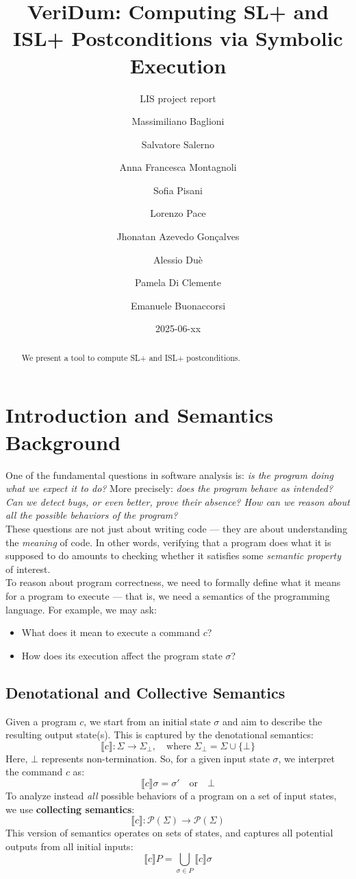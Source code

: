 \documentclass[parskip=half]{scrartcl}
\title{VeriDum: Computing SL+ and ISL+ Postconditions via Symbolic Execution}
\subtitle{LIS project report}
\date{2025-06-xx}
\author{ %
  Massimiliano Baglioni      \and
  Salvatore Salerno          \and
  Anna Francesca Montagnoli  \and
  Sofia Pisani               \and
  Lorenzo Pace               \and
  Jhonatan Azevedo Gonçalves \and
  Alessio Duè                \and
  Pamela Di Clemente         \and
  Emanuele Buonaccorsi}
\begin{document}
\maketitle

\begin{abstract}
  We present a tool to compute SL+ and ISL+ postconditions.
\end{abstract}

\section{Introduction and Semantics Background}

One of the fundamental questions in software analysis is: \emph{is the program doing what we expect it to do?} More precisely: \emph{does the program behave as intended? Can we detect bugs, or even better, prove their absence? How can we reason about all the possible behaviors of the program?}
\\ These questions are not just about writing code — they are about understanding the \emph{meaning} of code. In other words, verifying that a program does what it is supposed to do amounts to checking whether it satisfies some \emph{semantic property} of interest.
\\ To reason about program correctness, we need to formally define what it means for a program to execute — that is, we need a semantics of the programming language. For example, we may ask:
\begin{itemize}
    \item What does it mean to execute a command \( c \)?
    \item How does its execution affect the program state \( \sigma \)?
\end{itemize}

\subsection{Denotational and Collective Semantics}
Given a program \( c \), we start from an initial state \( \sigma \) and aim to describe the resulting output state(s). This is captured by the denotational semantics:
\[
\llbracket c \rrbracket : \Sigma \rightarrow \Sigma_{\bot}, \quad \text{where } \Sigma_{\bot} = \Sigma \cup \{ \bot \}
\]
Here, \( \bot \) represents non-termination. So, for a given input state \( \sigma \), we interpret the command \( c \) as:
\[
\llbracket c \rrbracket \sigma = \sigma' \quad \text{or} \quad \bot
\]
To analyze instead \emph{all} possible behaviors of a program on a set of input states, we use \textbf{collecting semantics}:
\[
\llbracket c \rrbracket : \mathcal{P}(\Sigma) \rightarrow \mathcal{P}(\Sigma)
\]
This version of semantics operates on sets of states, and captures all potential outputs from all initial inputs:
\[
\llbracket c \rrbracket P = \bigcup_{\sigma \in P} \llbracket c \rrbracket \sigma
\]
\end{document}
